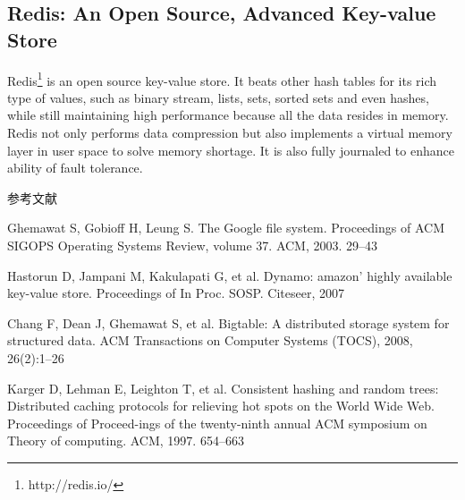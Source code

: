 \subsection*{Redis: An Open Source, Advanced Key-value Store}
Redis\footnote{http://redis.io/} is an open source key-value store. It beats
other hash tables for its rich type of values, such as binary stream, lists,
sets, sorted sets and even hashes, while still maintaining high performance
because all the data resides in memory. Redis not only performs data
compression but also implements a virtual memory layer in user space to solve
memory shortage. It is also fully journaled to enhance ability of fault
tolerance.

\begin{center}
参考文献
\end{center}
\begin{enumerate}[{[}1{]}]
  \item Ghemawat S, Gobioff H, Leung S. The Google file system. Proceedings of
  ACM SIGOPS Operating Systems Review, volume 37. ACM, 2003. 29–43
  \item Hastorun D, Jampani M, Kakulapati G, et al. Dynamo: amazon’ highly
  available key-value store. Proceedings of In Proc. SOSP. Citeseer, 2007
  \item Chang F, Dean J, Ghemawat S, et al. Bigtable: A distributed storage
  system for structured data. ACM Transactions on Computer Systems (TOCS),
  2008, 26(2):1–26
  \item Karger D, Lehman E, Leighton T, et al. Consistent hashing and random
  trees: Distributed caching protocols for relieving hot spots on the World
  Wide Web. Proceedings of Proceed-ings of the twenty-ninth annual ACM
  symposium on Theory of computing. ACM, 1997. 654–663
\end{enumerate}
